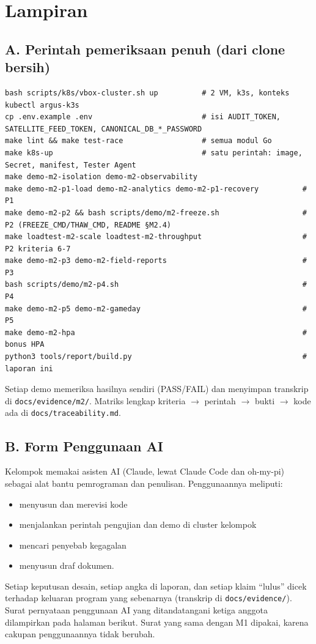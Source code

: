 \chapter{Lampiran}

\section{A. Perintah pemeriksaan penuh (dari clone bersih)}

\begin{lstlisting}
bash scripts/k8s/vbox-cluster.sh up          # 2 VM, k3s, konteks kubectl argus-k3s
cp .env.example .env                         # isi AUDIT_TOKEN, SATELLITE_FEED_TOKEN, CANONICAL_DB_*_PASSWORD
make lint && make test-race                  # semua modul Go
make k8s-up                                  # satu perintah: image, Secret, manifest, Tester Agent
make demo-m2-isolation demo-m2-observability
make demo-m2-p1-load demo-m2-analytics demo-m2-p1-recovery          # P1
make demo-m2-p2 && bash scripts/demo/m2-freeze.sh                   # P2 (FREEZE_CMD/THAW_CMD, README §M2.4)
make loadtest-m2-scale loadtest-m2-throughput                       # P2 kriteria 6-7
make demo-m2-p3 demo-m2-field-reports                               # P3
bash scripts/demo/m2-p4.sh                                          # P4
make demo-m2-p5 demo-m2-gameday                                     # P5
make demo-m2-hpa                                                    # bonus HPA
python3 tools/report/build.py                                       # laporan ini
\end{lstlisting}

Setiap demo memeriksa hasilnya sendiri (PASS/FAIL) dan menyimpan transkrip di \texttt{docs/\allowbreak{}evidence/\allowbreak{}m2/\allowbreak{}}. Matriks lengkap kriteria $\rightarrow$ perintah $\rightarrow$ bukti $\rightarrow$ kode ada di \texttt{docs/\allowbreak{}traceability.\allowbreak{}md}.


\section{B. Form Penggunaan AI}

Kelompok memakai asisten AI (Claude, lewat Claude Code dan oh-my-pi) sebagai alat bantu pemrograman dan penulisan. Penggunaannya meliputi:

\begin{itemize}
\item menyusun dan merevisi kode
\item menjalankan perintah pengujian dan demo di cluster kelompok
\item mencari penyebab kegagalan
\item menyusun draf dokumen.
\end{itemize}

Setiap keputusan desain, setiap angka di laporan, dan setiap klaim ``lulus'' dicek terhadap keluaran program yang sebenarnya (transkrip di \texttt{docs/\allowbreak{}evidence/\allowbreak{}}). Surat pernyataan penggunaan AI yang ditandatangani ketiga anggota dilampirkan pada halaman berikut. Surat yang sama dengan M1 dipakai, karena cakupan penggunaannya tidak berubah.

